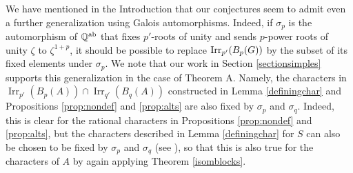 \documentclass[12pt,leqno,a4paper]{amsart}
\newcommand{\Q}{{\mathbb{Q}}}
\newcommand{\Irr}{{\operatorname{Irr}}}
\theoremstyle{remark}
\begin{document}
   \medskip
   We have mentioned in the Introduction that our conjectures seem to admit even a further generalization
   using Galois automorphisms. Indeed, if $\sigma_p$ is the automorphism of $\Q^{\rm ab}$ that
  fixes $p'$-roots of unity and sends $p$-power roots of unity $\zeta$ to $\zeta^{1+p}$,
  it should be possible to replace ${\rm Irr}_{p'}(B_p(G))$ by the subset of its
  fixed elements under $\sigma_p$. We note that our work in Section \ref{sectionsimples} supports this generalization in the case of Theorem A.  Namely, the characters in $\Irr_{p'}(B_p(A))\cap\Irr_{q'}(B_q(A))$ constructed in Lemma \ref{definingchar} and Propositions \ref{prop:nondef} and \ref{prop:alts} are also fixed by $\sigma_p$ and $\sigma_q$.  Indeed, this is clear for the rational characters in Propositions \ref{prop:nondef} and \ref{prop:alts}, but the characters described in Lemma \ref{definingchar} for $S$ can also be chosen to be fixed by $\sigma_p$ and $\sigma_q$ (see  \cite[Proposition 4.5 and its proof]{GHSV}), so that this is also true for the characters of $A$ by again applying Theorem \ref{isomblocks}.
   
  
  
\end{document}
